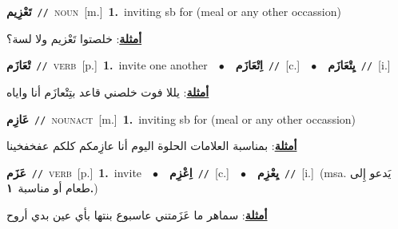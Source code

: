 \documentclass[10pt,a4paper,twoside]{article} %
\begin{document}
\begin{multicols}{2}
{\setlength\topsep{0pt}\textbf{\foreignlanguage{arabic}{تَعْزِيم}}\ {\color{gray}\texttt{//}\color{black}}\ \textsc{noun}\ [m.]\ \textbf{1.}~inviting sb for (meal or any other occassion)\  \begin{flushright}\color{gray}\foreignlanguage{arabic}{\textbf{\underline{\foreignlanguage{arabic}{أمثلة}}}: خلصتوا تَعْزيم ولا لسة؟}\end{flushright}\color{black}} \vspace{2mm}

{\setlength\topsep{0pt}\textbf{\foreignlanguage{arabic}{تْعَازَم}}\ {\color{gray}\texttt{//}\color{black}}\ \textsc{verb}\ [p.]\ \textbf{1.}~invite one another\ \ $\bullet$\ \ \setlength\topsep{0pt}\textbf{\foreignlanguage{arabic}{اِتْعَازَم}}\ {\color{gray}\texttt{//}\color{black}}\ [c.]\ \ $\bullet$\ \ \setlength\topsep{0pt}\textbf{\foreignlanguage{arabic}{يِتْعَازَم}}\ {\color{gray}\texttt{//}\color{black}}\ [i.]\  \begin{flushright}\color{gray}\foreignlanguage{arabic}{\textbf{\underline{\foreignlanguage{arabic}{أمثلة}}}: يللا فوت خلصني قاعد بتِتْعازَم أنا واياه}\end{flushright}\color{black}} \vspace{2mm}

{\setlength\topsep{0pt}\textbf{\foreignlanguage{arabic}{عَازِم}}\ {\color{gray}\texttt{//}\color{black}}\ \textsc{noun\textunderscore act}\ [m.]\ \textbf{1.}~inviting sb for (meal or any other occassion)\  \begin{flushright}\color{gray}\foreignlanguage{arabic}{\textbf{\underline{\foreignlanguage{arabic}{أمثلة}}}: بمناسبة العلامات الحلوة اليوم أنا عازِمكم كلكم عفخفخينا}\end{flushright}\color{black}} \vspace{2mm}

{\setlength\topsep{0pt}\textbf{\foreignlanguage{arabic}{عَزَم}}\ {\color{gray}\texttt{//}\color{black}}\ \textsc{verb}\ [p.]\ \textbf{1.}~invite\ \ $\bullet$\ \ \setlength\topsep{0pt}\textbf{\foreignlanguage{arabic}{اِعْزِم}}\ {\color{gray}\texttt{//}\color{black}}\ [c.]\ \ $\bullet$\ \ \setlength\topsep{0pt}\textbf{\foreignlanguage{arabic}{يِعْزِم}}\ {\color{gray}\texttt{//}\color{black}}\ [i.]\ \color{gray}(msa. \foreignlanguage{arabic}{يَدعو إِلى طعام أو مناسبة}~\foreignlanguage{arabic}{\textbf{١.}})\color{black}\  \begin{flushright}\color{gray}\foreignlanguage{arabic}{\textbf{\underline{\foreignlanguage{arabic}{أمثلة}}}: سماهر ما عَزَمتني عاسبوع بنتها بأي عين بدي أروح}\end{flushright}\color{black}} \vspace{2mm}


\end{multicols}
\end{document}
